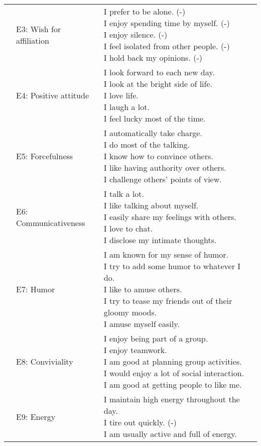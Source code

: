 \documentclass[,man,floatsintext]{apa6}
\theoremstyle{definition}
\theoremstyle{definition}
\theoremstyle{definition}
\theoremstyle{remark}
\begin{document}
\begin{longtable}[t]{lll}
\addlinespace
 & E3: Wish for affiliation & \makecell[l]{I prefer to be alone. (-)\\I enjoy spending time by myself. (-)\\I enjoy silence. (-)\\I feel isolated from other people. (-)\\I hold back my opinions. (-)}\\
\addlinespace
 & E4: Positive attitude & \makecell[l]{I look forward to each new day.\\I look at the bright side of life.\\I love life.\\I laugh a lot.\\I feel lucky most of the time.}\\
\addlinespace
 & E5: Forcefulness & \makecell[l]{I automatically take charge.\\I do most of the talking.\\I know how to convince others.\\I like having authority over others.\\I challenge others’ points of view.}\\
\addlinespace
 & E6: Communicativeness & \makecell[l]{I talk a lot.\\I like talking about myself.\\I easily share my feelings with others.\\I love to chat.\\I disclose my intimate thoughts.}\\
\addlinespace
 & E7: Humor & \makecell[l]{I am known for my sense of humor.\\I try to add some humor to whatever I do.\\I like to amuse others.\\I try to tease my friends out of their gloomy moods.\\I amuse myself easily.}\\
\addlinespace
 & E8: Conviviality & \makecell[l]{I enjoy being part of a group.\\I enjoy teamwork.\\I am good at planning group activities.\\I would enjoy a lot of social interaction.\\I am good at getting people to like me.}\\
\addlinespace
 & E9: Energy & \makecell[l]{I maintain high energy throughout the day.\\I tire out quickly. (-)\\I am usually active and full of energy.}\\

\end{longtable}
\end{document}
